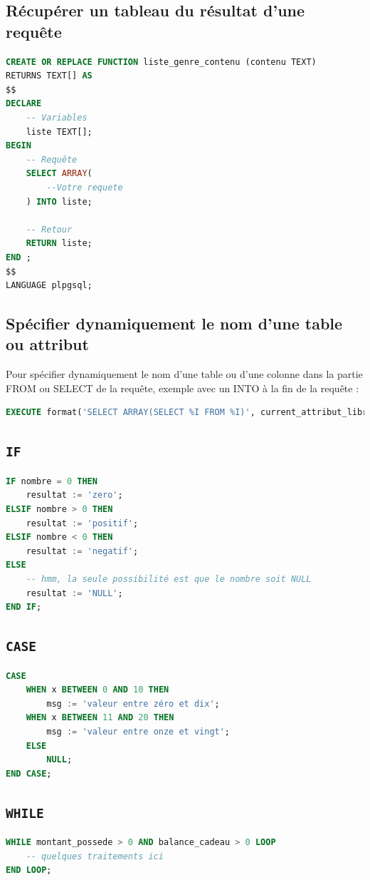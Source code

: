\subsection{Récupérer un tableau du résultat d'une requête}
\begin{lstlisting}[language=SQL]
CREATE OR REPLACE FUNCTION liste_genre_contenu (contenu TEXT)
RETURNS TEXT[] AS
$$
DECLARE
    -- Variables
    liste TEXT[];
BEGIN
    -- Requête
    SELECT ARRAY(
        --Votre requete
    ) INTO liste;
    
    -- Retour
    RETURN liste;
END ;
$$
LANGUAGE plpgsql;

\end{lstlisting}

\subsection{Spécifier dynamiquement le nom d'une table ou attribut}
Pour spécifier dynamiquement le nom d'une table ou d'une colonne dans la partie FROM ou SELECT de la requête, exemple avec un INTO à la fin de la requête :
\begin{lstlisting}[language=SQL]
EXECUTE format('SELECT ARRAY(SELECT %I FROM %I)', current_attribut_libre, current_table) INTO tab_text_libre;
\end{lstlisting}

\subsection{\texttt{IF}}
\begin{lstlisting}[language=SQL]
IF nombre = 0 THEN
    resultat := 'zero';
ELSIF nombre > 0 THEN
    resultat := 'positif';
ELSIF nombre < 0 THEN
    resultat := 'negatif';
ELSE
    -- hmm, la seule possibilité est que le nombre soit NULL
    resultat := 'NULL';
END IF;
\end{lstlisting}

\subsection{\texttt{CASE}}
\begin{lstlisting}[language=SQL]
CASE
    WHEN x BETWEEN 0 AND 10 THEN
        msg := 'valeur entre zéro et dix';
    WHEN x BETWEEN 11 AND 20 THEN
        msg := 'valeur entre onze et vingt';
    ELSE
        NULL;
END CASE;
\end{lstlisting}

\subsection{\texttt{WHILE}}
\begin{lstlisting}[language=SQL]
WHILE montant_possede > 0 AND balance_cadeau > 0 LOOP
    -- quelques traitements ici
END LOOP;
\end{lstlisting}

